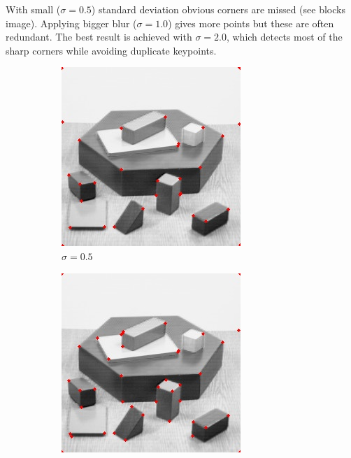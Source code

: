 \documentclass[10pt,a4paper,twoside]{article}
\begin{document}
With small ($\sigma=0.5$) standard deviation obvious corners are missed (see
blocks image). Applying bigger blur ($\sigma=1.0$) gives more points but these
are often redundant. The best result is achieved with $\sigma=2.0$, which
detects most of the sharp corners while avoiding duplicate keypoints.
\begin{figure}[h]
    \centering

    \begin{subfigure}{0.25\textwidth}
    \includegraphics[width=0.9\linewidth, height=0.9\linewidth]{sweep_blocks/blocks_05_005_1e-05.jpg} 
    \caption{$\sigma=0.5$}
    \end{subfigure}
    \begin{subfigure}{0.25\textwidth}
    \includegraphics[width=0.9\linewidth, height=0.9\linewidth]{sweep_blocks/blocks_10_005_1e-05.jpg} 

\end{subfigure}
\end{figure}
\end{document}
